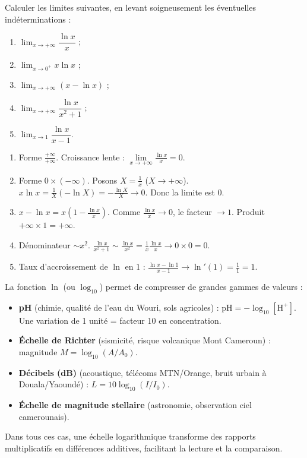 \documentclass[11pt]{article}
\begin{document}
\begin{exoresolu}
Calculer les limites suivantes, en levant soigneusement les éventuelles indéterminations :
\begin{enumerate}
\item $\displaystyle\lim_{x\to +\infty}\dfrac{\ln x}{x}$ ;
\item $\displaystyle\lim_{x\to 0^+} x\ln x$ ;
\item $\displaystyle\lim_{x\to +\infty}(x-\ln x)$ ;
\item $\displaystyle\lim_{x\to +\infty}\dfrac{\ln x}{x^2+1}$ ;
\item $\displaystyle\lim_{x\to 1}\dfrac{\ln x}{x-1}$.
\end{enumerate}
\tcblower
\begin{enumerate}
\item Forme $\frac{+\infty}{+\infty}$. Croissance lente : $\lim\limits_{x\to +\infty}\frac{\ln x}{x}=0$.
\item Forme $0 \times (-\infty)$. Posons $X=\frac{1}{x}$ ($X\to +\infty$). $x\ln x = \frac{1}{X}(-\ln X) = -\frac{\ln X}{X} \to 0$. Donc la limite est $\boxed{0}$.
\item $x-\ln x = x\left(1-\frac{\ln x}{x}\right)$. Comme $\frac{\ln x}{x}\to 0$, le facteur $\to 1$. Produit $+\infty \times 1 = \boxed{+\infty}$.
\item Dénominateur $\sim x^2$. $\frac{\ln x}{x^2+1} \sim \frac{\ln x}{x^2} = \frac{1}{x}\frac{\ln x}{x} \to 0 \times 0 = \boxed{0}$.
\item Taux d'accroissement de $\ln$ en $1$ : $\frac{\ln x - \ln 1}{x-1} \to \ln'(1) = \frac{1}{1} = \boxed{1}$.
\end{enumerate}
\end{exoresolu}

\begin{savaistu}
La fonction $\ln$ (ou $\log_{10}$) permet de compresser de grandes gammes de valeurs :
\begin{itemize}
\item \textbf{pH} (chimie, qualité de l'eau du Wouri, sols agricoles) : $\text{pH} = -\log_{10}[\text{H}^+]$. Une variation de 1 unité = facteur 10 en concentration.
\item \textbf{Échelle de Richter} (sismicité, risque volcanique Mont Cameroun) : magnitude $M = \log_{10}(A/A_0)$.
\item \textbf{Décibels (dB)} (acoustique, télécoms MTN/Orange, bruit urbain à Douala/Yaoundé) : $L = 10\log_{10}(I/I_0)$.
\item \textbf{Échelle de magnitude stellaire} (astronomie, observation ciel camerounais).
\end{itemize}
Dans tous ces cas, une échelle logarithmique transforme des rapports multiplicatifs en différences additives, facilitant la lecture et la comparaison.
\end{savaistu}
\end{document}
